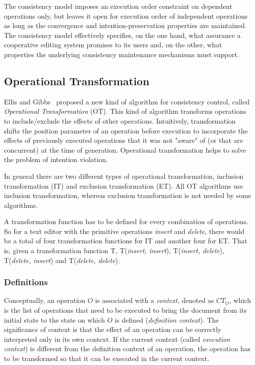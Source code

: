 \documentclass[11pt,a4paper]{article}
\begin{document}
The consistency model imposes an execution order constraint on dependent operations only, but leaves it open for execution order of independent operations as long as the convergence and intention-preservation properties are maintained. The consistency model effectively specifies, on the one hand, what assurance a cooperative editing system promises to its users and, on the other, what properties the underlying consistency maintenance mechanisms must support.


\subsection{Operational Transformation}
{Ellis and Gibbs}~\cite{ellis} proposed a new kind of algorithm for consistency control, called \emph{Operational Transformation} (OT).  This kind of algorithm transforms operations to include/exclude the effects of other operations. Intuitively, transformation shifts the position parameter of an operation before execution to incorporate the effects of previously executed operations that it was not "aware" of (or that are concurrent) at the time of generation. Operational transformation helps to solve the problem of intention violation.

In general there are two different types of operational transformation, inclusion transformation (IT) and exclusion transformation (ET). All OT algorithms use inclusion transformation, whereas exclusion transformation is not needed by some algorithms.

A transformation function has to be defined for every combination of operations. So for a text editor with the primitive operations \emph{insert} and \emph{delete}, there would be a total of four transformation functions for IT and another four for ET. That is, given a transformation function T, T(\emph{insert, insert}), T(\emph{insert, delete}), T(\emph{delete, insert}) and T(\emph{delete, delete}).

\subsubsection{Definitions}
\label{definitions}
Conceptually, an operation $O$ is associated with a \emph{context}, denoted as $CT_{O}$, which is the list of operations that need to be executed to bring the document from its initial state to the state on which $O$ is defined (\emph{definition context}). The significance of context is that the effect of an operation can be correctly interpreted only in its own context. If the current context (called \emph{execution context}) is different from the definition context of an operation, the operation has to be transformed so that it can be executed in the current context.
\end{document}
